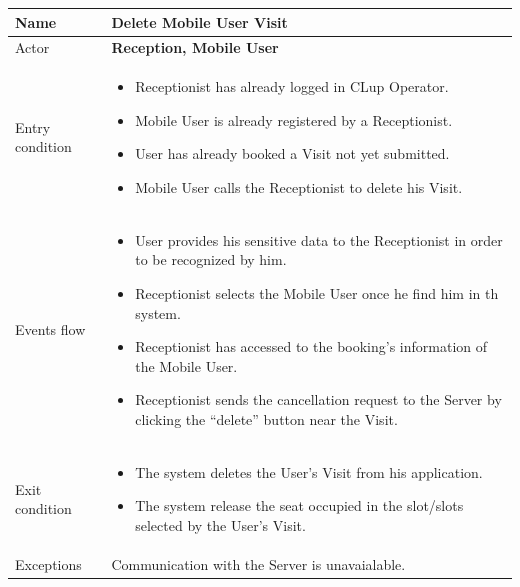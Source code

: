 \begin{tabular}{|p{5cm} | p{7cm} | }
	\hline
	Name & \textbf{Delete Mobile User Visit}  \\
	\hline
	Actor & \textbf{Reception, Mobile User} \\
	\hline
	Entry condition &
	\begin{itemize}
        \item Receptionist has already logged in CLup Operator. 
 		\item Mobile User is already registered by a Receptionist.
		\item User has already booked a Visit not yet submitted. 
        \item Mobile User calls the Receptionist to delete his Visit.
	\end{itemize} \\
	\hline
	Events flow & 
	\begin{itemize}
		\item User provides his sensitive data to the Receptionist in order to be recognized by him. 
        \item Receptionist selects the Mobile User once he find him in th system.
		\item Receptionist has accessed to the booking's information of the Mobile User.
		\item Receptionist sends the cancellation request to the Server by clicking the “delete” button near the Visit.
	\end{itemize} \\
	\hline
	Exit condition & \begin{itemize}	
		\item The system deletes the User's Visit from his application.
		\item The system release the seat occupied in the slot/slots selected by the User's Visit.
	\end{itemize}\\
	\hline 
	Exceptions & 
	Communication with the Server is unavaialable. \\
	\hline
\end{tabular}

